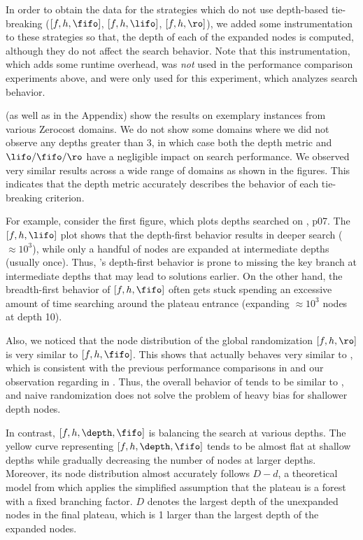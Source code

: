 In order to obtain the data for the strategies which do not use depth-based tie-breaking ($[f,h,\fifo]$, $[f,h,\lifo]$, $[f,h,\ro]$), we added some instrumentation to these strategies so that, the depth of each of the expanded nodes is computed, although they do not affect the search behavior.
Note that this instrumentation, which adds some runtime overhead, was \emph{not}
used in the performance comparison experiments above, and were only used for this experiment, which analyzes search behavior.


 (as well as  in the Appendix) show the results on exemplary instances from 
various Zerocost domains.  We do not show some domains where we did not observe any depths greater than 3, in which case both
the depth metric and  $\lifo/\fifo/\ro$ have a negligible impact on search performance.
We observed very similar results across a wide range of domains as shown in the figures.
This indicates that the depth metric accurately describes the behavior of each tie-breaking criterion.

For example, consider the first figure, which plots depths searched on , p07.
% 
The  $[f,h,\lifo]$ plot shows that the depth-first behavior results in deeper search ($\approx 10^3$), while
only a handful of nodes are expanded at intermediate depths (usually once). Thus,  \lifo's depth-first
behavior is prone to  missing the key branch at intermediate depths that may lead to solutions earlier.
On the other hand, the breadth-first behavior of $[f,h,\fifo]$ often gets stuck spending an excessive amount of
time searching around the plateau entrance (expanding $\approx 10^3$ nodes at depth 10).

Also, we noticed that the node distribution of the global randomization $[f,h,\ro]$ is very similar to $[f,h,\fifo]$.
This shows that \ro actually behaves very similar to \fifo, which is consistent with the previous performance comparisons in  and our observation regarding \ro in .
Thus, the overall behavior of \ro tends to be similar to \fifo, and naive randomization does not solve the problem of heavy bias for shallower depth nodes.

In contrast, $[f,h,\depth,\fifo]$ is balancing the search at various depths.
The yellow curve representing $[f,h,\depth,\fifo]$ tends to be almost flat at shallow depths while gradually decreasing the number of nodes at larger depths.
Moreover, its node distribution almost accurately follows $D-d$, a theoretical model from  which applies the simplified
assumption that the plateau is a forest with a fixed branching factor.
$D$ denotes the largest depth of the unexpanded nodes in the final plateau, which is
1 larger than the largest depth of the expanded nodes.

